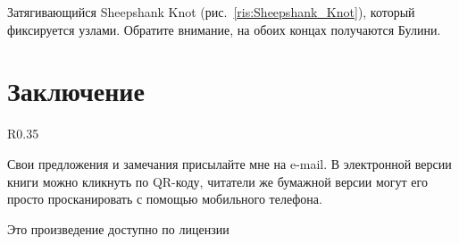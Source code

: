 \documentclass{artikel1}
\begin{document}
Затягивающийся Sheepshank Knot (рис.~\ref{ris:Sheepshank_Knot}), который фиксируется узлами. Обратите внимание, на обоих концах получаются Булини.

\section*{Заключение}

\begin{wrapfigure}[5]{R}{0.35\linewidth}
	\vspace{-7ex}
\end{wrapfigure}

Свои предложения и замечания присылайте мне на e-mail. В электронной версии книги можно кликнуть по QR-коду, читатели же бумажной версии могут его просто просканировать с помощью мобильного телефона.

\vfill


% 

\begin{center}
	Это произведение доступно по лицензии \doclicenseNameRef \\ \doclicenseImage[imagewidth=5em]
\end{center}
\end{document}
